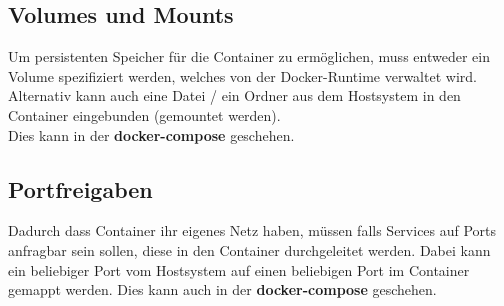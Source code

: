 \subsection{Volumes und Mounts}
\begin{frame}
    \slidehead
    \Large
    Um persistenten Speicher für die Container zu ermöglichen, muss entweder ein Volume spezifiziert werden,
    welches von der Docker-Runtime verwaltet wird. \\
    Alternativ kann auch eine Datei / ein Ordner aus dem Hostsystem in den Container eingebunden (gemountet werden).\\
    Dies kann in der \textbf{docker-compose} geschehen.
\end{frame}

\subsection{Portfreigaben}
\begin{frame}
    \slidehead
    \Large
    Dadurch dass Container ihr eigenes Netz haben, müssen falls Services auf Ports anfragbar sein sollen, diese in den
    Container durchgeleitet werden. Dabei kann ein beliebiger Port vom Hostsystem auf einen beliebigen Port im Container
    gemappt werden. Dies kann auch in der \textbf{docker-compose} geschehen.


\end{frame}
